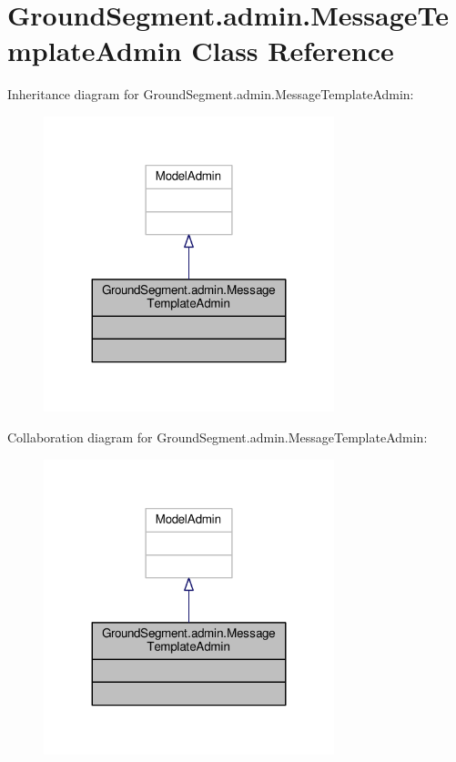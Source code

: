 \hypertarget{class_ground_segment_1_1admin_1_1_message_template_admin}{}\section{Ground\+Segment.\+admin.\+Message\+Template\+Admin Class Reference}
\label{class_ground_segment_1_1admin_1_1_message_template_admin}


Inheritance diagram for Ground\+Segment.\+admin.\+Message\+Template\+Admin\+:\nopagebreak
\begin{figure}[H]
\begin{center}
\leavevmode
\includegraphics[width=239pt]{class_ground_segment_1_1admin_1_1_message_template_admin__inherit__graph}
\end{center}
\end{figure}


Collaboration diagram for Ground\+Segment.\+admin.\+Message\+Template\+Admin\+:\nopagebreak
\begin{figure}[H]
\begin{center}
\leavevmode
\includegraphics[width=239pt]{class_ground_segment_1_1admin_1_1_message_template_admin__coll__graph}
\end{center}
\end{figure}


